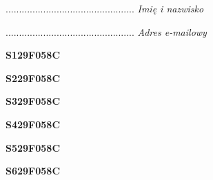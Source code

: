 \begin{turn}{90}\begin{minipage}{\linewidth} \vspace{20mm} ................................................  \textit{Imię i nazwisko}\end{minipage}\end{turn}

\begin{turn}{90}\begin{minipage}{\linewidth} \vspace{20mm} ................................................  \textit{Adres e-mailowy}\end{minipage}\end{turn}

\begin{turn}{90}\huge \begin{minipage}{\linewidth} \vspace{10mm}\textbf{S129F058C}\end{minipage}\end{turn}

\begin{turn}{90}\huge \begin{minipage}{\linewidth} \vspace{10mm}\textbf{S229F058C}\end{minipage}\end{turn}

\begin{turn}{90}\huge \begin{minipage}{\linewidth} \vspace{10mm}\textbf{S329F058C}\end{minipage}\end{turn}

\begin{turn}{90}\huge \begin{minipage}{\linewidth} \vspace{10mm}\textbf{S429F058C}\end{minipage}\end{turn}

\begin{turn}{90}\huge \begin{minipage}{\linewidth} \vspace{10mm}\textbf{S529F058C}\end{minipage}\end{turn}

\begin{turn}{90}\huge \begin{minipage}{\linewidth} \vspace{10mm}\textbf{S629F058C}\end{minipage}\end{turn}


